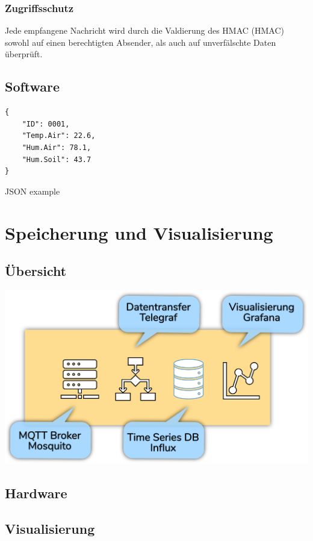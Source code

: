 \documentclass[
  12pt, %
  a4paper, %
  twoside, %
  openany, %
  numbers=noenddot, %
  BCOR=5mm, %
  parskip=half*, %
  thesis, %
]{bfhbook}
\begin{document}
\subsection{Zugriffsschutz}
Jede empfangene Nachricht wird durch die Valdierung des HMAC (\Gls{HMAC}) sowohl auf einen berechtigten Absender, als auch auf unverfälschte Daten überprüft.
\section{Software}
\begin{listing}
\begin{verbatim}
{     
    "ID": 0001, 
    "Temp.Air": 22.6,
    "Hum.Air": 78.1, 
    "Hum.Soil": 43.7
}
\end{verbatim}
\caption{JSON example} 
\label{json-example}
\end{listing}
\chapter{Speicherung und Visualisierung}
\section{Übersicht}
\begin{center}
\includegraphics[width=17cm, left]{Bilder/Raspberry-Software.png}%
\label{labelname}%
\end{center}
\section{Hardware}
\section{Visualisierung}
\end{document}

